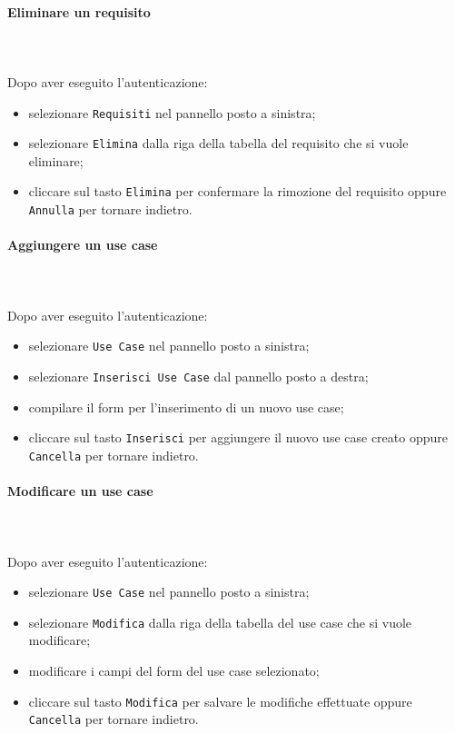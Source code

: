 \paragraph{Eliminare un requisito} \mbox{}\\ \mbox{}\\
Dopo aver eseguito l'autenticazione:
\begin{itemize}
	\item selezionare \texttt{Requisiti} nel pannello posto a sinistra;
	\item selezionare \texttt{Elimina} dalla riga della tabella del requisito 
		che si vuole eliminare;\
	\item cliccare sul tasto \texttt{Elimina} per confermare la rimozione del requisito
		oppure \texttt{Annulla} per tornare indietro.
\end{itemize}

\paragraph{Aggiungere un use case} \mbox{}\\ \mbox{}\\
Dopo aver eseguito l'autenticazione:
\begin{itemize}
	\item selezionare \texttt{Use Case} nel pannello posto a sinistra;
	\item selezionare \texttt{Inserisci Use Case} dal pannello posto a destra;
	\item compilare il form per l'inserimento di un nuovo use case;
	\item cliccare sul tasto \texttt{Inserisci} per aggiungere il nuovo use case
		creato oppure \texttt{Cancella} per tornare indietro.	
\end{itemize}

\paragraph{Modificare un use case} \mbox{}\\ \mbox{}\\
Dopo aver eseguito l'autenticazione:
\begin{itemize}
	\item selezionare \texttt{Use Case} nel pannello posto a sinistra;
	\item selezionare \texttt{Modifica} dalla riga della tabella del use case
		che si vuole modificare;
	\item modificare i campi del form del use case selezionato;
	\item cliccare sul tasto \texttt{Modifica} per salvare le modifiche effettuate
		oppure \texttt{Cancella} per tornare indietro.
\end{itemize}

